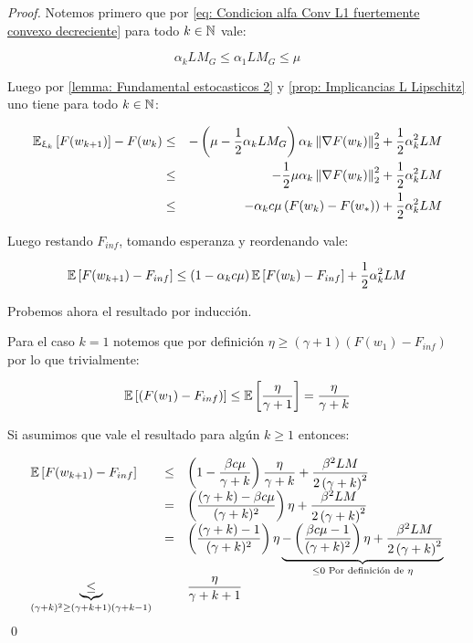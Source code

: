 \begin{proof}
	Notemos primero que por \ref{eq: Condicion alfa Conv L1 fuertemente convexo decreciente} para todo $k \in {\mathbb{N}}$ vale:
	
	\begin{equation*}
		\alpha_k L M_G \leq \alpha_1 L M_G \leq \mu
	\end{equation*}
	
	Luego por \ref{lemma: Fundamental estocasticos 2} y \ref{prop: Implicancias L Lipschitz} uno tiene para todo $k \in {\mathbb{N}}$:
	
	\begin{equation*}
	\begin{aligned}
		\mathbb{E}_{\upxi_{k}} \left[F(w_{k+1})\right] - F(w_k) & \leq & - \left( \mu - \frac{1}{2} \alpha_k L M_G \right)\alpha_k \left\lVert\nabla F(w_k)\right\rVert_2^2 + \frac{1}{2} \alpha_k^2 L M \\
		& \leq & - \frac{1}{2} \mu\alpha_k \left\lVert\nabla F(w_k)\right\rVert_2^2 + \frac{1}{2} \alpha_k^2 L M \\
		& \leq & - \alpha_k c \mu \left(F(w_k) - F(w_*)\right) + \frac{1}{2} \alpha_k^2 L M
	\end{aligned}
	\end{equation*}
	
	Luego restando $F_{inf}$, tomando esperanza y reordenando vale:
	
	\begin{equation*}
		\mathbb{E} \left[F(w_{k+1}) - F_{inf}\right] \leq \left(1 - \alpha_k c \mu \right) \mathbb{E} \left[F(w_{k}) - F_{inf}\right]  + \frac{1}{2} \alpha_k^2 L M
	\end{equation*}
	
	Probemos ahora el resultado por inducci\'on. 
	
	Para el caso $k=1$ notemos que por definici\'on $\eta \geq \left(\gamma + 1\right) \left(F(w_1) - F_{inf}\right)$ por lo que trivialmente:
	
	\begin{equation*}
		\mathbb{E} \left[\left(F(w_1) - F_{inf}\right)\right] \leq \mathbb{E} \left[\dfrac{\eta}{\gamma +1}\right] = \dfrac{\eta}{\gamma + k}
	\end{equation*}
	
	Si asumimos que vale el resultado para alg\'un $k \geq 1$ entonces:
	
	\begin{equation*}
	\begin{array}{lll}
		\mathbb{E} \left[F(w_{k+1}) - F_{inf}\right] & \leq & \left(1 - \dfrac{\beta c \mu }{\gamma + k}\right) \dfrac{\eta}{\gamma + k} + \dfrac{\beta^2 LM}{2 \left(\gamma + k\right)^2} \\
		& = & \left(\dfrac{(\gamma + k) - \beta c \mu }{(\gamma + k)^2}\right) {\eta}+ \dfrac{\beta^2 LM}{2 \left(\gamma + k\right)^2} \\
		& = & \left(\dfrac{(\gamma + k) - 1}{(\gamma + k)^2}\right) {\eta}  \underbrace{- \left(\dfrac{\beta c \mu -1}{(\gamma + k)^2}\right)\eta +  \dfrac{\beta^2 LM}{2 \left(\gamma + k\right)^2}}_{\leq 0 \text{ Por definici\'on de } \eta}\\
		\underbrace{\leq}_{(\gamma + k)^2 \geq (\gamma + k + 1)(\gamma + k - 1)} & & \dfrac{\eta}{\gamma + k + 1}
	\end{array}
	\end{equation*}\qed


\end{proof}
